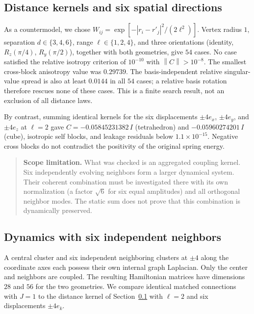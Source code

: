 \documentclass[a4paper,11pt]{article}
\newcommand{\norm}[1]{\left\lVert#1\right\rVert}
\begin{document}
\subsection{Distance kernels and six spatial directions}\label{sec:kernels}
As a countermodel, we chose $W_{ij}=\exp[-|r_i-r'_j|^2/(2\ell^2)]$. Vertex radius $1$, separation $d\in\{3,4,6\}$, range $\ell\in\{1,2,4\}$, and three orientations (identity, $R_z(\pi/4)$, $R_y(\pi/2)$), together with both geometries, give $54$ cases. No case satisfied the relative isotropy criterion of $10^{-10}$ with $\norm C>10^{-8}$. The smallest cross-block anisotropy value was $0.29739$. The basis-independent relative singular-value spread is also at least $0.0144$ in all $54$ cases; a relative basis rotation therefore rescues none of these cases. This is a finite search result, not an exclusion of all distance laws.

By contrast, summing identical kernels for the six displacements $\pm4e_x$, $\pm4e_y$, and $\pm4e_z$ at $\ell=2$ gave $C=-0.05845231382\,I$ (tetrahedron) and $-0.05960274201\,I$ (cube), isotropic self blocks, and leakage residuals below $1.1\times10^{-15}$. Negative cross blocks do not contradict the positivity of the original spring energy.

\begin{quote}\textbf{Scope limitation.}
What was checked is an aggregated coupling kernel. Six independently evolving neighbors form a larger dynamical system. Their coherent combination must be investigated there with its own normalization (a factor $\sqrt6$ for six equal amplitudes) and all orthogonal neighbor modes. The static sum does not prove that this combination is dynamically preserved.
\end{quote}

\subsection{Dynamics with six independent neighbors}\label{sec:network}
A central cluster and six independent neighboring clusters at $\pm4$ along the coordinate axes each possess their own internal graph Laplacian. Only the center and neighbors are coupled. The resulting Hamiltonian matrices have dimensions $28$ and $56$ for the two geometries. We compare identical matched connections with $J=1$ to the distance kernel of Section~\ref{sec:kernels} with $\ell=2$ and six displacements $\pm4e_k$.
\end{document}
